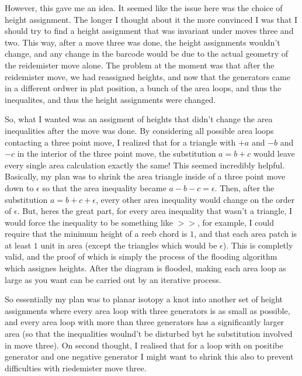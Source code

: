 \documentclass[11pt,oneside]{amsart}
\begin{document}
However, this gave me an idea. It seemed like the issue here was the choice of height assignment. The longer I thought about it the more convinced I was that I should try to find a height assignment that was invariant under moves three and two. This way, after a move three was done, the height assignments wouldn't change, and any change in the barcode would be due to the actual geometry of the reidemister move alone. The problem at the moment was that after the reidemister move, we had reassigned heights, and now that the generators came in a different ordwer in plat position, a bunch of the area loops, and thus the inequalites, and thus the height assignments were changed. 

So, what I wanted was an assigment of heights that didn't change the area inequalities after the move was done. By considering all possible area loops contacting a three point move, I realized that for a triangle with $+a$ and $-b$ and $-c$ in the interior of the three point move, the substitution $a = b+c$ would leave every single area calculation exactly the same! This seemed incredibly helpful. Basically, my plan was to shrink the area triangle inside of a three point move down to $\epsilon$ so that the area inequality became $a - b - c= \epsilon$. Then, after the substitution $a = b + c + \epsilon$, every other area inequality would change on the order of $\epsilon$. But, heres the great part, for every area inequality that wasn't a triangle, I would force the inequality to be something like $>>$, for example, I could require that the minimum height of a reeb chord is $1$, and that each area patch is at least $1$ unit in area (except the triangles which would be $\epsilon$). This is completly valid, and the proof of which is simply the process of the flooding algorithm which assignes heights. After the diagram is flooded, making each area loop as large as you want can be carried out by an iterative process. 


So essentially my plan was to planar isotopy a knot into another set of height assignments where every area loop with three generators is as small as possible, and every area loop with more than three generators has a significantly larger area (so that the inequalities woulnd't be disturbed byt he substitution involved in move three). On second thought, I realised that for a loop with on positibe generator and one negative generator I might want to shrink this also to prevent difficulties with riedemister move three.
\end{document}
